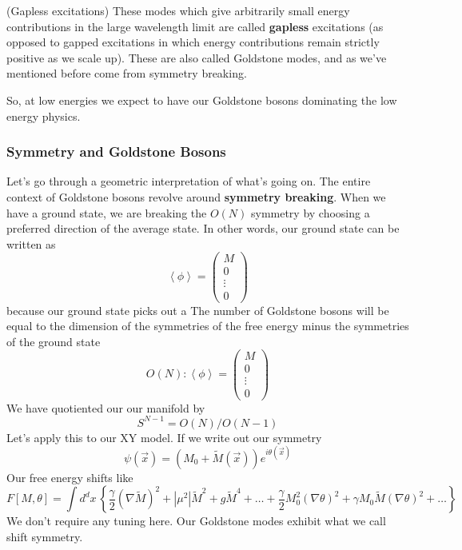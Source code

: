 \begin{defn}{(Gapless excitations)}
	These modes which give 
	arbitrarily small energy contributions in the 
	large wavelength limit are called \textbf{gapless} excitations 
	(as opposed to gapped excitations in which energy 
	contributions remain strictly positive as we scale up). 
	These are also called Goldstone modes, and as we've
	mentioned before come from symmetry breaking. 
\end{defn}
So, at low energies we expect to have our Goldstone bosons 
dominating the low energy physics. 

\subsubsection{Symmetry and Goldstone Bosons}
Let's go through a geometric interpretation 
of what's going on. The entire 
context of Goldstone bosons revolve around 
\textbf{symmetry breaking}. When we have a ground state, 
we are breaking the $ O ( N ) $ symmetry by choosing 
a preferred direction of the average state. In other words, 
our ground state can be written as 
\[
  \left< \phi  \right>  = \begin{pmatrix} M \\ 0 \\ \vdots \\ 0  \end{pmatrix} 
\] 
because our ground state picks out a 
The number of Goldstone bosons will be equal to the 
dimension of the symmetries of the free energy
minus the symmetries of the ground state
\[
O ( N ) : \left< \phi  \right>  = \begin{pmatrix} M \\ 0 \\ \vdots \\ 0  \end{pmatrix} 
\] We have quotiented our our manifold by 
\[
S ^{ N - 1 }  = O ( N ) / O ( N - 1) 
\] 
Let's apply this to our XY model. 
If we write out our symmetry 
\[
\psi ( \vec{x} )  = \left(  M_ 0 + \tilde{ M } ( \vec{x} )   \right)  e^{ i \theta ( \vec{x} ) }
\] Our free energy shifts like
\[
F [ M , \theta ]  = \int d ^ d x \, \left\{  
\frac{\gamma }{ 2 } ( \nabla  \tilde{ M } ) ^ 2 + | \mu ^ 2 | \tilde{M} ^ 2 + 
g \tilde{ M } ^ 4 + \dots + \frac{\gamma }{ 2 } M _0 ^ 2 ( \nabla \theta ) ^ 2 + 
\gamma M _ 0 \tilde{ M } ( \nabla \theta ) ^ 2 + \dots \right\} 
\] We don't require any tuning here. Our Goldstone modes exhibit 
what we call shift symmetry. 

